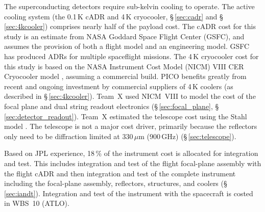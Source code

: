 %

The superconducting detectors require sub-kelvin cooling to
operate. The active cooling system (the 0.1\,K cADR and 4\,K
cryocooler, \S\,\ref{sec:cadr} and \S\,\ref{sec:4kcooler}) comprises nearly half of the payload
cost. The cADR cost for this study is an estimate from NASA Goddard
Space Flight Center (GSFC), and assumes the provision of both a flight
model and an engineering model. GSFC has produced ADRs for multiple
spaceflight missions. The 4\,K cryocooler cost for this study is based
on the NASA Instrument Cost Model (NICM) VIII CER Cryocooler model
\cite{Mrozinski2017}, assuming a commercial build. PICO benefits
greatly from recent and ongoing investment by commercial suppliers of
4\,K coolers (as described in \S\,\ref{sec:4kcooler}).  Team~X used NICM~VIII to model
the cost of the focal plane and dual string readout electronics (\S\,\ref{sec:focal_plane},
\S\,\ref{sec:detector_readout}).  Team~X estimated the telescope cost using the Stahl model
\cite{Stahl2016}. The telescope is not a major cost driver, primarily
because the reflectors only need to be diffraction limited at 330\,$\mu$m
(900\,GHz) (\S\,\ref{sec:telescope}).

Based on JPL experience, 18\,\% of the instrument cost is allocated
for integration and test. This includes integration and test of the
flight focal-plane assembly with the flight cADR and then integration
and test of the complete instrument including the focal-plane
assembly, reflectors, structures, and coolers (\S\,\ref{sec:iandt}). Integration and
test of the instrument with the spacecraft is costed in WBS~10
(ATLO).

